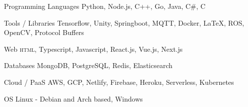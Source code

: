 

\begin{cvskills}

  \cvskill
  {Programming Languages} %
  {Python, Node.js, C++, Go, Java, C\#, C} %

  \cvskill
  {Tools / Libraries} %
  {Tensorflow, Unity, Springboot, MQTT, Docker, \LaTeX, ROS, OpenCV, Protocol Buffers} %

  \cvskill
  {Web} %
  {\textsc{html}, Typescript, Javascript, React.js, Vue.js, Next.js} %

  \cvskill
  {Databases} %
  {MongoDB, PostgreSQL, Redis, Elasticsearch} %

  \cvskill
  {Cloud / PaaS} %
  {AWS, GCP, Netlify, Firebase, Heroku, Serverless, Kubernetes} %

  \cvskill
  {OS} %
  {Linux - Debian and Arch based, Windows} %

\end{cvskills}
